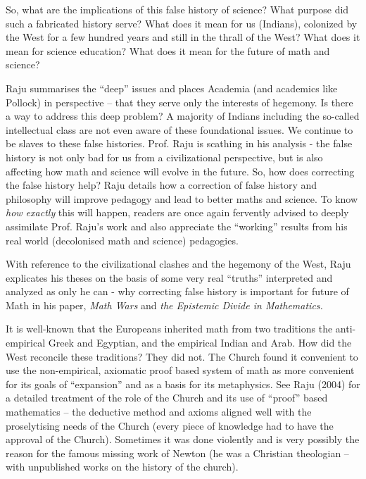 So, what are the implications of this false history of science? What purpose did such a fabricated history serve? What does it mean for us (Indians), colonized by the West for a few hundred years and still in the thrall of the West? What does it mean for science education? What does it mean for the future of math and science?

Raju summarises the “deep” issues and places Academia (and academics like Pollock) in perspective – that they serve only the interests of hegemony. Is there a way to address this deep problem? A majority of Indians including the so-called intellectual class are not even aware of these foundational issues. We continue to be slaves to these false histories. Prof. Raju is scathing in his analysis - the false history is not only bad for us from a civilizational perspective, but is also affecting how math and science will evolve in the future. So, how does correcting the false history help? Raju details how a correction of false history and philosophy will improve pedagogy and lead to better maths and science. To know \textit{how exactly} this will happen, readers are once again fervently advised to deeply assimilate Prof. Raju’s work and also appreciate the “working” results from his real world (decolonised math and science) pedagogies.

With reference to the civilizational clashes and the hegemony of the West, Raju explicates his theses on the basis of some very real “truths” interpreted and analyzed as only he can - why correcting false history is important for future of Math in his paper, \textit{Math Wars} and \textit{the Epistemic Divide in Mathematics.}

It is well-known that the Europeans inherited math from two traditions the anti-empirical Greek and Egyptian, and the empirical Indian and Arab. How did the West reconcile these traditions? They did not. The Church found it convenient to use the non-empirical, axiomatic proof based system of math as more convenient for its goals of “expansion” and as a basis for its metaphysics. See Raju (2004) for a detailed treatment of the role of the Church and its use of “proof” based mathematics – the deductive method and axioms aligned well with the proselytising needs of the Church (every piece of knowledge had to have the approval of the Church). Sometimes it was done violently and is very possibly the reason for the famous missing work of Newton (he was a Christian theologian – with unpublished works on the history of the church).

